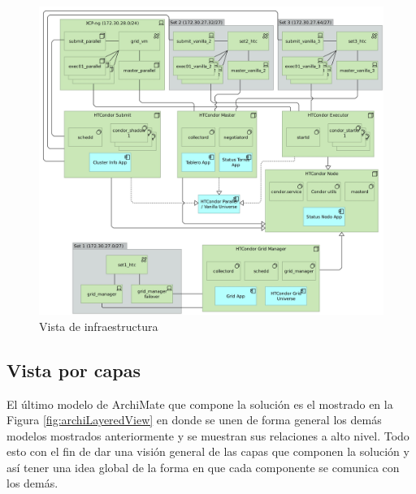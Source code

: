 \begin{figure}[H]
	\centering
	\includegraphics[scale=0.103]{tablas-images/archi/Infrastructure View.jpg}
	\caption{Vista de infraestructura}
    \label{fig:archiInfrastructureView}
\end{figure}

\subsection{Vista por capas}
\noindent
El último modelo de ArchiMate que compone la solución es el mostrado en la Figura \ref{fig:archiLayeredView} en donde se unen de forma general los demás modelos mostrados anteriormente y se muestran sus relaciones a alto nivel. Todo esto con el fin de dar una visión general de las capas que componen la solución y así tener una idea global de la forma en que cada componente se comunica con los demás.

